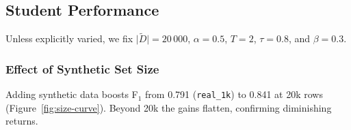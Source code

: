 \documentclass[11pt]{article}
\begin{document}
\subsection{Student Performance}
\label{sec:student-results}

Unless explicitly varied, we fix $\lvert\tilde{D}\rvert=20\,000$,
$\alpha=0.5$, $T=2$, $\tau=0.8$, and $\beta=0.3$.

\subsubsection{Effect of Synthetic Set Size}
\label{sec:size}
Adding synthetic data boosts F$_1$ from 0.791 (\texttt{real\_1k}) to
0.841 at 20k rows (Figure~\ref{fig:size-curve}).  Beyond 20k the gains
flatten, confirming diminishing returns.
\end{document}
